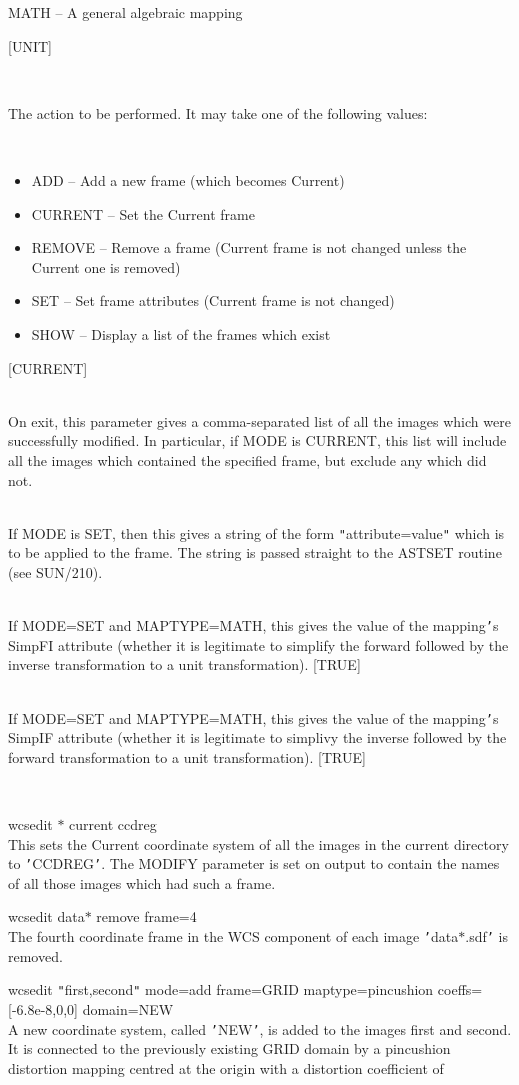 \documentclass[twoside,11pt]{article}
\newcommand{\xref}[3]{#1}
\renewcommand{\_}{\texttt{\symbol{95}}}
\newcommand{\qt}[1]{{\tt "}#1{\tt "}}
\newcommand{\sstexamples}[1]{
   \item[Examples:] \mbox{} \\
   \vspace{-3.5ex}
   \begin{description}
      #1
   \end{description}
}
\newcommand{\sstsubsection}[1]{ \item[{#1}] \mbox{} \\}
\newcommand{\sstexamplesubsection}[2]{\sloppy \item{\ssttt #1} \mbox{} \\ #2 }
\newcommand{\sstitemlist}[1]{
  \mbox{} \\
  \vspace{-3.5ex}
  \begin{itemize}
     #1
  \end{itemize}
}
\newcommand{\sstitem}{\item}
\newcommand{\sstexamples}[1]{
      \item[Examples:] \\
      \begin{description}
         #1
      \end{description}
      \\
   }
\newcommand{\sstsubsection}[1]{\item[{#1}]}
\newcommand{\sstexamplesubsection}[2]{\item[{\ssttt #1}] #2}
\newcommand{\sstitemlist}[1]{
      \begin{itemize}
         #1
      \end{itemize}
      \\
   }
\newcommand{\sstitem}{\item}
\begin{document}
{{{{            \sstitem
               MATH       -- A general algebraic mapping
         }
         [UNIT]
      }
      \sstsubsection{
         MODE = LITERAL (Read)
      } {
         The action to be performed.  It may take one of the following
         values:
         \sstitemlist{
            \sstitem
               ADD      -- Add a new frame (which becomes Current)
            \sstitem
               CURRENT  -- Set the Current frame
            \sstitem
               REMOVE   -- Remove a frame (Current frame is not changed
                           unless the Current one is removed)
            \sstitem
               SET      -- Set frame attributes (Current frame is not
                           changed)
            \sstitem
               SHOW     -- Display a list of the frames which exist
         }
         [CURRENT]
      }
      \sstsubsection{
         MODIFIED = LITERAL (Write)
      } {
         On exit, this parameter gives a comma-separated list of all the
         images which were successfully modified.  In particular, if MODE
         is CURRENT, this list will include all the images which contained
         the specified frame, but exclude any which did not.
      }
      \sstsubsection{
         SET = LITERAL (Read)
      } {
         If MODE is SET, then this gives a string of the form
         \qt{attribute=value} which is to be applied to the frame.  The
         string is passed straight to the \xref{AST\_SET}{sun210}{AST\_SET} 
         routine (see \xref{SUN/210}{sun210}{}).
      }
      \sstsubsection{
         SIMPFI = \_LOGICAL (Read)
      }{
         If MODE=SET and MAPTYPE=MATH, this gives the value of the
         mapping{\tt '}s SimpFI attribute (whether it is legitimate to simplify
         the forward followed by the inverse transformation to a unit
         transformation).
         [TRUE]
      }
      \sstsubsection{
         SIMPIF = \_LOGICAL (Read)
      }{
         If MODE=SET and MAPTYPE=MATH, this gives the value of the
         mapping{\tt '}s SimpIF attribute (whether it is legitimate to simplivy
         the inverse followed by the forward transformation to a unit
         transformation).
         [TRUE]
      }
   }
   \sstexamples{
      \sstexamplesubsection{
         wcsedit $*$ current ccd\_reg
      }{
         This sets the Current coordinate system of all the images in
         the current directory to {\tt '}CCD\_REG{\tt '}.  The MODIFY parameter is
         set on output to contain the names of all those images which
         had such a frame.
      }
      \sstexamplesubsection{
         wcsedit data$*$ remove frame=4
      }{
         The fourth coordinate frame in the WCS component of each image
         {\tt '}data$*$.sdf{\tt '} is removed.
      }
      \sstexamplesubsection{
         wcsedit {\tt "}first,second{\tt "} mode=add frame=GRID maptype=pincushion
              coeffs=[-6.8e-8,0,0] domain=NEW
      }{
         A new coordinate system, called {\tt '}NEW{\tt '}, is added to the images
         first  and second.  It is connected to the previously
         existing GRID domain by a pincushion distortion mapping
         centred at the origin with a distortion coefficient of
         \sstitemlist{

}}}}
\end{document}

